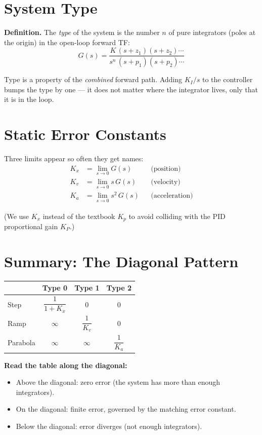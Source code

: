 \documentclass[11pt]{article}
\begin{document}
\section*{System Type}

\textbf{Definition.}  The \emph{type} of the system is the number $n$ of
pure integrators (poles at the origin) in the open-loop forward TF:
\[
  G(s) = \frac{K\,(s+z_1)(s+z_2)\cdots}{s^n\,(s+p_1)(s+p_2)\cdots}
\]

Type is a property of the \emph{combined} forward path.  Adding $K_I/s$
to the controller bumps the type by one --- it does not matter where the
integrator lives, only that it is in the loop.

\section*{Static Error Constants}

Three limits appear so often they get names:
\begin{align*}
  K_x &= \lim_{s\to 0} G(s)        &&\text{(position)} \\
  K_v &= \lim_{s\to 0} s\,G(s)     &&\text{(velocity)} \\
  K_a &= \lim_{s\to 0} s^2\,G(s)   &&\text{(acceleration)}
\end{align*}

(We use $K_x$ instead of the textbook $K_p$ to avoid colliding with the
PID proportional gain $K_P$.)

\section*{Summary: The Diagonal Pattern}

\begin{center}
\begin{tabular}{lccc}
\toprule
         & Type 0              & Type 1              & Type 2 \\
\midrule
Step     & $\dfrac{1}{1+K_x}$  & $0$                 & $0$ \\[8pt]
Ramp     & $\infty$            & $\dfrac{1}{K_v}$    & $0$ \\[8pt]
Parabola & $\infty$            & $\infty$            & $\dfrac{1}{K_a}$ \\
\bottomrule
\end{tabular}
\end{center}

\textbf{Read the table along the diagonal:}
\begin{itemize}
  \item Above the diagonal: zero error (the system has more than enough
    integrators).
  \item On the diagonal: finite error, governed by the matching error
    constant.
  \item Below the diagonal: error diverges (not enough integrators).
\end{itemize}
\end{document}
